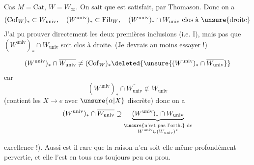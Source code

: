 {}

Cas $M=\mathrm{Cat}$, $W=W_\infty$. On sait que  est satisfait, par
Thomason. Donc on a 
\[
 (\mathrm{Cof}_W)_*\subset W_{\mathrm{univ}},\quad(W^{\mathrm{univ}})_*\subset\mathrm{Fib}_W,\quad
 (W^{\mathrm{univ}})_*\cap W_{\mathrm{univ}}\ \text{clos à \unsure{droite}}
\]
J'ai pu prouver directement les deux premières inclusions
(i.e. $\mathrm I$), mais pas que $(W^{\mathrm{univ}})_*\cap W_{\mathrm{univ}}$ soit clos
à droite. (Je devrais au moins essayer !)

 
\[
 (W^{\mathrm{univ}})_*\cap\overline{W_{\mathrm{univ}}}\ne(\mathrm{Cof}_W)_*
 \deleted{\unsure{(W^{\mathrm{univ}})_*\cap\overline{W_{\mathrm{univ}}}}}
\]
car
\[
 (W^{\mathrm{univ}})_*\cap\overline{W_{\mathrm{univ}}}\not\subset W_{\mathrm{univ}}
\]
(contient les $X\to e$ avec $\unsure{\alpha|X}$ discrète)
donc on a
\[
 (W^{\mathrm{univ}})_*\cap\overline{W_{\mathrm{univ}}}\supsetneq
 \underbrace{(W^{\mathrm{univ}})_*\cap W_{\mathrm{univ}}}_{\substack{\text{\unsure{n'est pas l'orth.} de}\\W^{\mathrm{univ}}\cup(W_{\mathrm{univ}})^*}}
\]

excellence !). Aussi est-il rare que la raison n'en soit elle-même profondément pervertie, et elle l'est en tous cas toujours peu ou prou.

